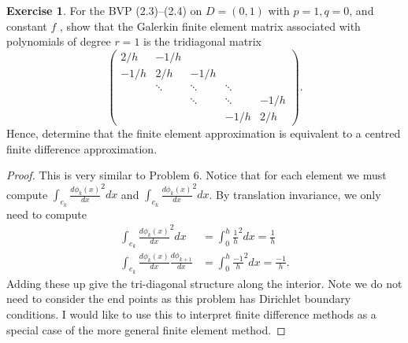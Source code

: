 \documentclass{amsart}
\theoremstyle{plain}
\theoremstyle{definition}
\newtheorem{exer}{Exercise}[section]
\begin{document}
\begin{exer}
    For the BVP (2.3)–(2.4) on $D = (0, 1)$ with $p = 1, q = 0$, and constant $f$ , show that the Galerkin finite element matrix associated with polynomials of degree $r = 1$ is the tridiagonal matrix
    $$
    \begin{pmatrix}
        2/h & -1/h &  &  & \\
        -1/h & 2/h & -1/h & & \\
         &\ddots & \ddots & \ddots & \\
          & & \ddots & \ddots & -1/h\\
          & & & -1/h & 2/h
    \end{pmatrix}.
    $$
    Hence, determine that the finite element approximation is equivalent to a centred finite difference approximation.
\end{exer}
\begin{proof}
    This is very similar to Problem $6$. Notice that for each element we must compute 
    $\int_{e_k} \frac{d\phi_k(x)}{dx}^2 dx$ and  $\int_{e_k} \frac{d\phi_k(x)}{dx}^2 dx$. By translation invariance, we only need to compute 
    \begin{align*}
        \int_{e_k} \frac{d\phi_k(x)}{dx}^2 dx & = \int_0^h \frac{1}{h}^2 dx  = \frac{1}{h}\\
        \int_{e_k} \frac{d\phi_k(x)}{dx}\frac{d\phi_{k+1}}{dx} &= \int_0^h \frac{-1}{h}^2 dx  = \frac{-1}{h}.
    \end{align*}
    Adding these up give the tri-diagonal structure along the interior. Note we do not need to consider the end points as this problem has Dirichlet boundary conditions. I would like to use this to interpret finite difference methods as a special case of the more general finite element method. 
\end{proof}
\end{document}
